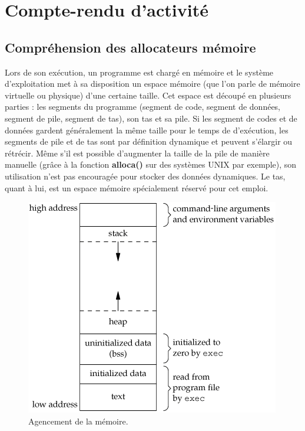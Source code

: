\chapter{Compte-rendu d'activité}
\section{Compréhension des allocateurs mémoire}
Lors de son exécution, un programme est chargé en mémoire et le système d'exploitation
met à sa disposition un espace mémoire (que l'on parle de mémoire virtuelle ou physique)
d'une certaine taille. Cet espace est découpé en plusieurs parties : les segments du programme
(segment de code, segment de données, segment de pile, segment de tas), son tas et sa pile. Si les segment de codes et de
données gardent généralement la même taille pour le temps de d'exécution, les segments de pile et de tas sont par définition
dynamique et peuvent s'élargir ou rétrécir. Même s'il est possible d'augmenter la taille de la pile de manière manuelle (grâce
à la fonction \textbf{alloca()} sur des systèmes UNIX par exemple), son utilisation n'est pas encouragée pour stocker des données
dynamiques. Le tas, quant à lui, est un espace mémoire spécialement réservé pour cet emploi.
\begin{figure}[h]
    \centering
    \includegraphics[scale=0.4]{images/memory-layout.png}\newline
    \caption{Agencement de la mémoire.}
\end{figure}


